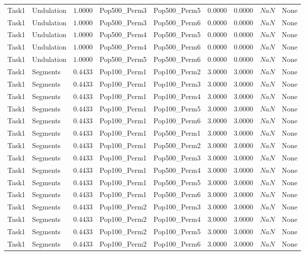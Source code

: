 \documentclass[8pt]{article}
\begin{document}
\begin{longtable}{llccccccc}
Task1 & Undulation & $1.0000$ & Pop500\_Perm3 & Pop500\_Perm5 & 0.0000 & 0.0000 & $NaN$ & None \\
Task1 & Undulation & $1.0000$ & Pop500\_Perm3 & Pop500\_Perm6 & 0.0000 & 0.0000 & $NaN$ & None \\
Task1 & Undulation & $1.0000$ & Pop500\_Perm4 & Pop500\_Perm5 & 0.0000 & 0.0000 & $NaN$ & None \\
Task1 & Undulation & $1.0000$ & Pop500\_Perm4 & Pop500\_Perm6 & 0.0000 & 0.0000 & $NaN$ & None \\
Task1 & Undulation & $1.0000$ & Pop500\_Perm5 & Pop500\_Perm6 & 0.0000 & 0.0000 & $NaN$ & None \\
Task1 & Segments & $0.4433$ & Pop100\_Perm1 & Pop100\_Perm2 & 3.0000 & 3.0000 & $NaN$ & None \\
Task1 & Segments & $0.4433$ & Pop100\_Perm1 & Pop100\_Perm3 & 3.0000 & 3.0000 & $NaN$ & None \\
Task1 & Segments & $0.4433$ & Pop100\_Perm1 & Pop100\_Perm4 & 3.0000 & 3.0000 & $NaN$ & None \\
Task1 & Segments & $0.4433$ & Pop100\_Perm1 & Pop100\_Perm5 & 3.0000 & 3.0000 & $NaN$ & None \\
Task1 & Segments & $0.4433$ & Pop100\_Perm1 & Pop100\_Perm6 & 3.0000 & 3.0000 & $NaN$ & None \\
Task1 & Segments & $0.4433$ & Pop100\_Perm1 & Pop500\_Perm1 & 3.0000 & 3.0000 & $NaN$ & None \\
Task1 & Segments & $0.4433$ & Pop100\_Perm1 & Pop500\_Perm2 & 3.0000 & 3.0000 & $NaN$ & None \\
Task1 & Segments & $0.4433$ & Pop100\_Perm1 & Pop500\_Perm3 & 3.0000 & 3.0000 & $NaN$ & None \\
Task1 & Segments & $0.4433$ & Pop100\_Perm1 & Pop500\_Perm4 & 3.0000 & 3.0000 & $NaN$ & None \\
Task1 & Segments & $0.4433$ & Pop100\_Perm1 & Pop500\_Perm5 & 3.0000 & 3.0000 & $NaN$ & None \\
Task1 & Segments & $0.4433$ & Pop100\_Perm1 & Pop500\_Perm6 & 3.0000 & 3.0000 & $NaN$ & None \\
Task1 & Segments & $0.4433$ & Pop100\_Perm2 & Pop100\_Perm3 & 3.0000 & 3.0000 & $NaN$ & None \\
Task1 & Segments & $0.4433$ & Pop100\_Perm2 & Pop100\_Perm4 & 3.0000 & 3.0000 & $NaN$ & None \\
Task1 & Segments & $0.4433$ & Pop100\_Perm2 & Pop100\_Perm5 & 3.0000 & 3.0000 & $NaN$ & None \\
Task1 & Segments & $0.4433$ & Pop100\_Perm2 & Pop100\_Perm6 & 3.0000 & 3.0000 & $NaN$ & None \\

\end{longtable}
\end{document}
